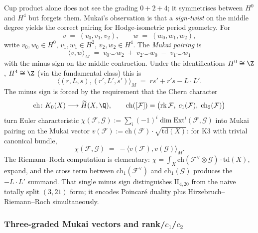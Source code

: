 Cup product alone does not see the grading $0 + 2 + 4$; it symmetrises between $H^0$ and $H^4$ but forgets them. Mukai's observation is that a \emph{sign-twist} on the middle degree yields the correct pairing for Hodge-isometric period geometry. For
\[
 v \;=\; (v_0, v_1, v_2), \qquad w \;=\; (w_0, w_1, w_2),
\]
write $v_0, w_0 \in H^0$, $v_1, w_1 \in H^2$, $v_2, w_2 \in H^4$. The \emph{Mukai pairing} is
\begin{equation}
 \langle v, w\rangle_M \;=\; v_0 \smile w_2 \;+\; v_2 \smile w_0 \;-\; v_1 \smile w_1
 \label{eq:mukai-pairing}
\end{equation}
with the minus sign on the middle contraction. Under the identifications $H^0 \cong \Z$, $H^4 \cong \Z$ (via the fundamental class) this is
\[
 \langle (r, L, s), (r', L', s')\rangle_M \;=\; r s' + r' s - L \cdot L'.
\]
The minus sign is forced by the requirement that the Chern character
\[
 \mathrm{ch}\colon K_0(X) \longrightarrow \widetilde H(X, \Q),
 \qquad
 \mathrm{ch}([\mathcal F]) = \bigl(\mathrm{rk}\, \mathcal F, \; c_1(\mathcal F), \; \mathrm{ch}_2(\mathcal F)\bigr)
\]
turn Euler characteristic $\chi(\mathcal F, \mathcal G) := \sum_i (-1)^i \dim \mathrm{Ext}^i(\mathcal F, \mathcal G)$ into Mukai pairing on the Mukai vector $v(\mathcal F) := \mathrm{ch}(\mathcal F) \cdot \sqrt{\mathrm{td}(X)}$: for K3 with trivial canonical bundle,
\[
 \chi(\mathcal F, \mathcal G) \;=\; -\langle v(\mathcal F), v(\mathcal G)\rangle_M.
\]
The Riemann--Roch computation is elementary: $\chi = \int_X \mathrm{ch}(\mathcal F^\vee \otimes \mathcal G) \cdot \mathrm{td}(X)$, expand, and the cross term between $\mathrm{ch}_1(\mathcal F^\vee)$ and $\mathrm{ch}_1(\mathcal G)$ produces the $-L \cdot L'$ summand. That single minus sign distinguishes $\mathrm{II}_{4, 20}$ from the naive totally split $(3, 21)$ form; it encodes Poincar\'e duality plus Hirzebruch--Riemann--Roch simultaneously.

\subsubsection{Three-graded Mukai vectors and rank/$c_1$/$c_2$}

